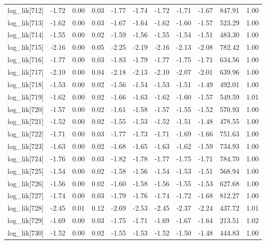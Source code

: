 \begin{table}[ht]
\begin{tabular}{rrrrrrrrrrr}
  log\_lik[712] & -1.72 & 0.00 & 0.03 & -1.77 & -1.74 & -1.72 & -1.71 & -1.67 & 847.91 & 1.00 \\ 
  log\_lik[713] & -1.62 & 0.00 & 0.03 & -1.67 & -1.64 & -1.62 & -1.60 & -1.57 & 523.29 & 1.00 \\ 
  log\_lik[714] & -1.55 & 0.00 & 0.02 & -1.59 & -1.56 & -1.55 & -1.54 & -1.51 & 483.30 & 1.00 \\ 
  log\_lik[715] & -2.16 & 0.00 & 0.05 & -2.25 & -2.19 & -2.16 & -2.13 & -2.08 & 782.42 & 1.00 \\ 
  log\_lik[716] & -1.77 & 0.00 & 0.03 & -1.83 & -1.79 & -1.77 & -1.75 & -1.71 & 634.56 & 1.00 \\ 
  log\_lik[717] & -2.10 & 0.00 & 0.04 & -2.18 & -2.13 & -2.10 & -2.07 & -2.01 & 639.96 & 1.00 \\ 
  log\_lik[718] & -1.53 & 0.00 & 0.02 & -1.56 & -1.54 & -1.53 & -1.51 & -1.49 & 492.01 & 1.00 \\ 
  log\_lik[719] & -1.62 & 0.00 & 0.02 & -1.66 & -1.63 & -1.62 & -1.60 & -1.57 & 549.59 & 1.01 \\ 
  log\_lik[720] & -1.57 & 0.00 & 0.02 & -1.61 & -1.58 & -1.57 & -1.55 & -1.52 & 570.93 & 1.00 \\ 
  log\_lik[721] & -1.52 & 0.00 & 0.02 & -1.55 & -1.53 & -1.52 & -1.51 & -1.48 & 478.55 & 1.00 \\ 
  log\_lik[722] & -1.71 & 0.00 & 0.03 & -1.77 & -1.73 & -1.71 & -1.69 & -1.66 & 751.63 & 1.00 \\ 
  log\_lik[723] & -1.63 & 0.00 & 0.02 & -1.68 & -1.65 & -1.63 & -1.62 & -1.59 & 734.93 & 1.00 \\ 
  log\_lik[724] & -1.76 & 0.00 & 0.03 & -1.82 & -1.78 & -1.77 & -1.75 & -1.71 & 784.70 & 1.00 \\ 
  log\_lik[725] & -1.54 & 0.00 & 0.02 & -1.58 & -1.56 & -1.54 & -1.53 & -1.51 & 568.94 & 1.00 \\ 
  log\_lik[726] & -1.56 & 0.00 & 0.02 & -1.60 & -1.58 & -1.56 & -1.55 & -1.53 & 627.68 & 1.00 \\ 
  log\_lik[727] & -1.74 & 0.00 & 0.03 & -1.79 & -1.76 & -1.74 & -1.72 & -1.68 & 812.27 & 1.00 \\ 
  log\_lik[728] & -2.45 & 0.01 & 0.12 & -2.69 & -2.53 & -2.45 & -2.37 & -2.24 & 437.72 & 1.01 \\ 
  log\_lik[729] & -1.69 & 0.00 & 0.03 & -1.75 & -1.71 & -1.69 & -1.67 & -1.64 & 213.51 & 1.02 \\ 
  log\_lik[730] & -1.52 & 0.00 & 0.02 & -1.55 & -1.53 & -1.52 & -1.50 & -1.48 & 444.83 & 1.00 \\ 

\end{tabular}
\end{table}
